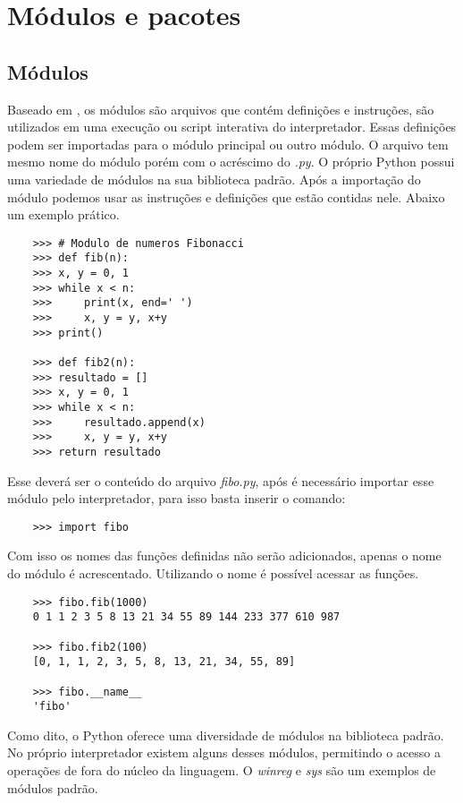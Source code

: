 	
    \section{Módulos e pacotes}



            \subsection{Módulos}
	Baseado em \cite{Perkovic2016}, os módulos são arquivos que contém definições e instruções, são utilizados em uma execução ou script interativa do interpretador. Essas definições podem ser importadas para o módulo principal ou outro módulo. O arquivo tem mesmo nome do módulo porém com o acréscimo do \textit{.py}. O próprio Python possui uma variedade de módulos na sua biblioteca padrão. Após a importação do módulo podemos usar as instruções e definições que estão contidas nele. Abaixo um exemplo prático. 
	\begin{lstlisting}
	>>> # Modulo de numeros Fibonacci 
	>>> def fib(n):   
	>>>	x, y = 0, 1
	>>>	while x < n:
	>>>		print(x, end=' ')
	>>>		x, y = y, x+y
	>>>	print()
		
	>>> def fib2(n):   
	>>>	resultado = []
	>>>	x, y = 0, 1
	>>>	while x < n:
	>>>		resultado.append(x)
	>>>		x, y = y, x+y
	>>>	return resultado
	\end{lstlisting}

	Esse deverá ser o conteúdo do arquivo \textit{fibo.py}, após é necessário importar esse módulo pelo interpretador, para isso basta inserir o comando:
	
	\begin{lstlisting}
	>>> import fibo
	\end{lstlisting}
	Com isso os nomes das funções definidas não serão adicionados, apenas o nome do módulo é acrescentado. Utilizando o nome é possível acessar as funções.
	\begin{lstlisting}
	>>> fibo.fib(1000)
	0 1 1 2 3 5 8 13 21 34 55 89 144 233 377 610 987
	
	>>> fibo.fib2(100)
	[0, 1, 1, 2, 3, 5, 8, 13, 21, 34, 55, 89]
	
	>>> fibo.__name__
	'fibo'
	\end{lstlisting}
	Como dito, o Python oferece uma diversidade de módulos na biblioteca padrão. No próprio interpretador existem alguns desses módulos, permitindo o acesso a operações de fora do núcleo da linguagem. O \textit{winreg} e \textit{sys} são um exemplos de módulos padrão. \cite{Perkovic2016}
